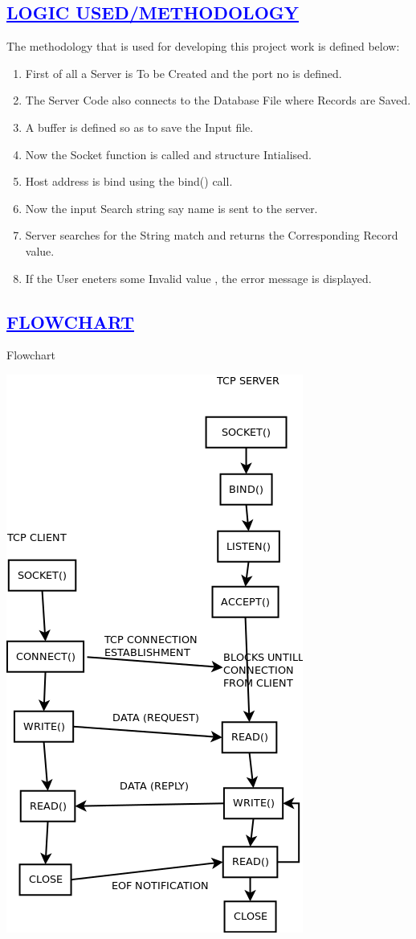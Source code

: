 \documentclass[a4paper,12pt]{report}
\begin{document}
\begin{center}
\chapter{\textcolor{blue}{\underline {LOGIC USED/METHODOLOGY}}}
\end{center}
The methodology that is used for developing this project work is defined below:
\begin{enumerate} 
\item First of all a Server is To be Created and the port no is defined.
\item The Server Code also connects to the Database File where Records are Saved.
\item A buffer is defined so as to save the Input file.
\item Now the Socket function is called and structure Intialised.
\item Host address is bind using the bind() call.
\item Now the input Search string say name is sent to the server.
\item Server searches for the String match and returns the Corresponding Record value.
\item If the User eneters some Invalid value , the error message is displayed.
\end{enumerate}

\begin{center}
\chapter{\textcolor{blue}{\underline {FLOWCHART}}}
\end{center}
\noindent Flowchart\\
\begin{center}
 \includegraphics[width=12 cm,height=12 cm]{./flowchart.png}
\end{center}
\end{document}
